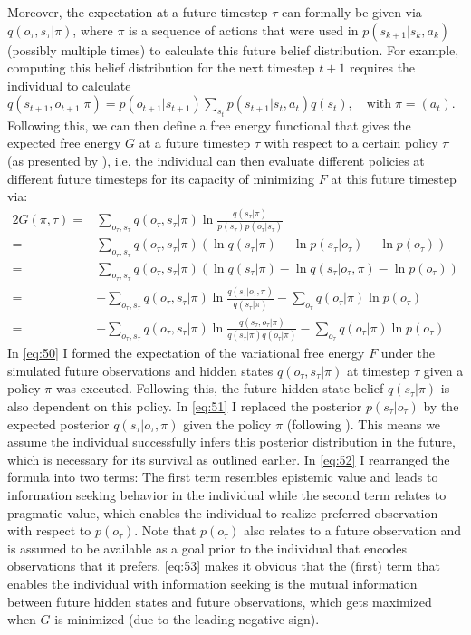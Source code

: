 Moreover, the expectation at a future timestep \(\tau\) can formally be given via \(q(o_{\tau},s_{\tau}|\pi)\), where \(\pi\) is a sequence of actions that were used in \(p(s_{k+1}|s_k,a_k)\) (possibly multiple times) to calculate this future belief distribution. For example, computing this belief distribution for the next timestep \(t+1\) requires the individual to calculate \(q(s_{t+1},o_{t+1}|\pi) = p(o_{t+1}|s_{t+1}) \sum_{s_t} p(s_{t+1}|s_t,a_t) q(s_t), \quad \text{with} \; \pi = (a_t)\). Following this, we can then define a free energy functional that gives the expected free energy \(G\) at a future timestep \(\tau\) with respect to a certain policy \(\pi\) (as presented by \textcite{friston2015}), i.e, the individual can then evaluate different policies at different future timesteps for its capacity of minimizing \(F\) at this future timestep via:
\begin{alignat}{2}
    G(\pi,\tau) =& \sum_{o_{\tau},s_{\tau}} q(o_{\tau},s_{\tau}|\pi) \ln \frac{q(s_{\tau}|\pi)}{p(s_{\tau})p(o_{\tau}|s_{\tau})} \label{eq:50} \\
    =& \sum_{o_{\tau},s_{\tau}} q(o_{\tau},s_{\tau}|\pi) \left( \ln q(s_{\tau}|\pi) - \ln p(s_{\tau}|o_{\tau}) - \ln p(o_{\tau}) \right) \\
    =& \sum_{o_{\tau},s_{\tau}} q(o_{\tau},s_{\tau}|\pi) \left( \ln q(s_{\tau}|\pi) - \ln q(s_{\tau}|o_{\tau},\pi) - \ln p(o_{\tau}) \right) \label{eq:51} \\
    =& - \sum_{o_{\tau},s_{\tau}} q(o_{\tau},s_{\tau}|\pi) \ln \frac{q(s_{\tau}|o_{\tau},\pi)}{q(s_{\tau}|\pi)} - \sum_{o_{\tau}} q(o_{\tau}|\pi) \ln p(o_{\tau}) \label{eq:52} \\
    =&  - \sum_{o_{\tau},s_{\tau}} q(o_{\tau},s_{\tau}|\pi) \ln \frac{q(s_{\tau},o_{\tau}|\pi)}{q(s_{\tau}|\pi)q(o_{\tau}|\pi)} - \sum_{o_{\tau}} q(o_{\tau}|\pi) \ln p(o_{\tau}) \label{eq:53}
\end{alignat}
In \cref{eq:50} I formed the expectation of the variational free energy \(F\) under the simulated future observations and hidden states \(q(o_{\tau},s_{\tau}|\pi)\) at timestep \(\tau\) given a policy \(\pi\) was executed. Following this, the future hidden state belief \(q(s_{\tau}|\pi)\) is also dependent on this policy. In \cref{eq:51} I replaced the posterior \(p(s_{\tau}|o_{\tau})\) by the expected posterior \(q(s_{\tau}|o_{\tau},\pi)\) given the policy \(\pi\) (following \cite{friston2015}). This means we assume the individual successfully infers this posterior distribution in the future, which is necessary for its survival as outlined earlier. In \cref{eq:52} I rearranged the formula into two terms: The first term resembles epistemic value and leads to information seeking behavior in the individual while the second term relates to pragmatic value, which enables the individual to realize preferred observation with respect to \(p(o_{\tau})\). Note that \(p(o_{\tau})\) also relates to a future observation and is assumed to be available as a goal prior to the individual that encodes observations that it prefers. \cref{eq:53} makes it obvious that the (first) term that enables the individual with information seeking is the mutual information between future hidden states and future observations, which gets maximized when \(G\) is minimized (due to the leading negative sign).

